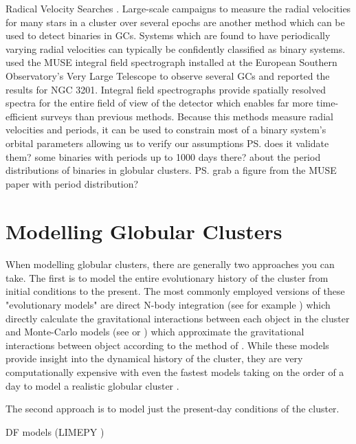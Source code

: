 Radical Velocity Searches \citet{Giesers2019}. Large-scale campaigns to measure the radial
velocities for many stars in a cluster over several epochs are another method which can be used to
detect binaries in GCs. Systems which are found to have periodically varying radial velocities can
typically be confidently classified as binary systems. \citet{Giesers2019} used the MUSE integral
field spectrograph installed at the European Southern Observatory's Very Large Telescope to observe
several GCs and reported the results for NGC 3201. Integral field spectrographs provide spatially
resolved spectra for the entire field of view of the detector which enables far more time-efficient
surveys than previous methods. Because this methods measure radial velocities and periods, it can be
used to constrain most of a binary system's orbital parameters allowing us to verify our assumptions
\ps{does it validate them? some binaries with periods up to 1000 days there?} about the period
distributions of binaries in globular clusters. \ps{grab a figure from the MUSE paper with period
distribution?}



\section{Modelling Globular Clusters}

\paragraph{}
When modelling globular clusters, there are generally two approaches you can take. The first is to
model the entire evolutionary history of the cluster from initial conditions to the present. The
most commonly employed versions of these "evolutionary models" are direct N-body integration (see
for example \citet{Baumgardt2017a}) which directly calculate the gravitational interactions between
each object in the cluster and Monte-Carlo models (see \citet{Rodriguez2021} or \cite{Hypki2013})
which approximate the gravitational interactions between object according to the method of
\citet{Henon1971}. While these models provide insight into the dynamical history of the cluster,
they are very computationally expensive with even the fastest models taking on the order of a day
to model a realistic globular cluster \citep{Rodriguez2021}.

The second approach is to model just the present-day conditions of the cluster.

DF models (LIMEPY \citet{Gieles2015})

